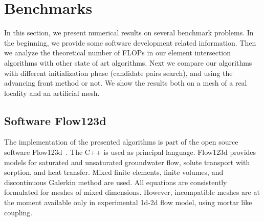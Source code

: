 % 





\section{Benchmarks}
\label{sec:benchmarks}

In this section, we present numerical results on several benchmark problems. 
In the beginning, we provide some software development related information.
Then we analyze the theoretical number of FLOPs in our element intersection algorithms with 
other state of art algorithms.
Next we compare our algorithms with different initialization phase (candidate pairs search),
and using the advancing front method or not. We show the results both on a mesh of a real locality
and an artificial mesh.


\subsection{Software Flow123d}
The implementation of the presented algorithms is part of the open source software Flow123d~\cite{flow123d}.
The C++ is used as principal language. Flow123d provides models for saturated and unsaturated groundwater flow,
solute transport with sorption, and  heat transfer. Mixed finite elements, finite volumes, and discontinuous Galerkin method are 
used. All equations are consistently formulated for meshes of mixed dimensions.  However,
incompatible meshes are at the moment available only in experimental 1d-2d flow model, using mortar like coupling.

